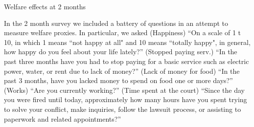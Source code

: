 \documentclass[oneside,12pt]{article}
\begin{document}

\begin{table}[!ht]
    \caption{Welfare effects at 2 months} 
    \label{tab:11_welfare}
    \center
    \scriptsize{}
    \begin{figurenotes}
    In the 2 month survey we included a battery of questions in an attempt to measure welfare proxies. In particular, we asked (Happiness) “On a scale of 1 t 10, in which 1 means “not happy at all" and 10 means “totally happy", in general, how happy do you feel about your life lately?” (Stopped paying serv.) “In the past three months have you had to stop paying for a basic service such as electric power, water, or rent due to lack of money?” (Lack of money for food) “In the past 3 months, have you lacked money to spend on food one or more days?” (Works) “Are you currently working?” (Time spent at the court) “Since the day you were fired until today, approximately how many hours have you spent trying to solve your conflict, make inquiries, follow the lawsuit process, or assisting to paperwork and related appointments?”
    \end{figurenotes}
  
\end{table}
\end{document}

